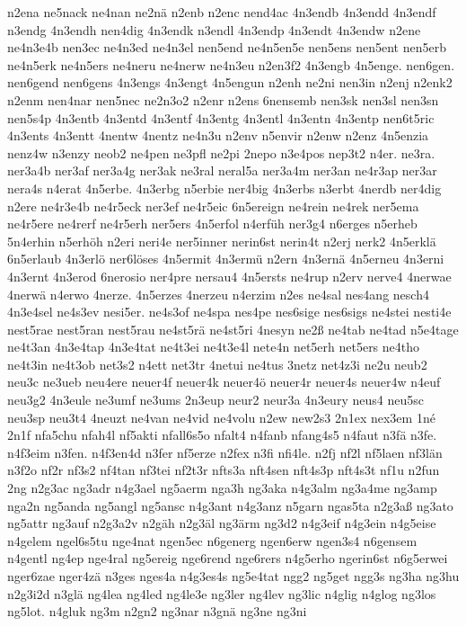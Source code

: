 {n2ena
ne5nack
ne4nan
ne2nä
n2enb
n2enc
nend4ac
4n3endb
4n3endd
4n3endf
n3endg
4n3endh
nen4dig
4n3endk
n3endl
4n3endp
4n3endt
4n3endw
n2ene
ne4n3e4b
nen3ec
ne4n3ed
ne4n3el
nen5end
ne4n5en5e
nen5ens
nen5ent
nen5erb
ne4n5erk
ne4n5ers
ne4neru
ne4nerw
ne4n3eu
n2en3f2
4n3engb
4n5enge.
nen6gen.
nen6gend
nen6gens
4n3engs
4n3engt
4n5engun
n2enh
ne2ni
nen3in
n2enj
n2enk2
n2enm
nen4nar
nen5nec
ne2n3o2
n2enr
n2ens
6nensemb
nen3sk
nen3sl
nen3sn
nen5s4p
4n3entb
4n3entd
4n3entf
4n3entg
4n3entl
4n3entn
4n3entp
nen6t5ric
4n3ents
4n3entt
4nentw
4nentz
ne4n3u
n2env
n5envir
n2enw
n2enz
4n5enzia
nenz4w
n3enzy
neob2
ne4pen
ne3pfl
ne2pi
2nepo
n3e4pos
nep3t2
n4er.
ne3ra.
ner3a4b
ner3af
ner3a4g
ner3ak
ne3ral
neral5a
ner3a4m
ner3an
ne4r3ap
ner3ar
nera4s
n4erat
4n5erbe.
4n3erbg
n5erbie
ner4big
4n3erbs
n3erbt
4nerdb
ner4dig
n2ere
ne4r3e4b
ne4r5eck
ner3ef
ne4r5eic
6n5ereign
ne4rein
ne4rek
ner5ema
ne4r5ere
ne4rerf
ne4r5erh
ner5ers
4n5erfol
n4erfüh
ner3g4
n6erges
n5erheb
5n4erhin
n5erhöh
n2eri
neri4e
ner5inner
nerin6st
nerin4t
n2erj
nerk2
4n5erklä
6n5erlaub
4n3erlö
ner6löses
4n5ermit
4n3ermü
n2ern
4n3ernä
4n5erneu
4n3erni
4n3ernt
4n3erod
6nerosio
ner4pre
nersau4
4n5ersts
ne4rup
n2erv
nerve4
4nerwae
4nerwä
n4erwo
4nerze.
4n5erzes
4nerzeu
n4erzim
n2es
ne4sal
nes4ang
nesch4
4n3e4sel
ne4s3ev
nesi5er.
ne4s3of
ne4spa
nes4pe
nes6sige
nes6sigs
ne4stei
nesti4e
nest5rae
nest5ran
nest5rau
ne4st5rä
ne4st5ri
4nesyn
ne2ß
ne4tab
ne4tad
n5e4tage
ne4t3an
4n3e4tap
4n3e4tat
ne4t3ei
ne4t3e4l
nete4n
net5erh
net5ers
ne4tho
ne4t3in
ne4t3ob
net3s2
n4ett
net3tr
4netui
ne4tus
3netz
net4z3i
ne2u
neub2
neu3c
ne3ueb
neu4ere
neuer4f
neuer4k
neuer4ö
neuer4r
neuer4s
neuer4w
n4euf
neu3g2
4n3eule
ne3umf
ne3ums
2n3eup
neur2
neur3a
4n3eury
neus4
neu5sc
neu3sp
neu3t4
4neuzt
ne4van
ne4vid
ne4volu
n2ew
new2s3
2n1ex
nex3em
1né
2n1f
nfa5chu
nfah4l
nf5akti
nfall6s5o
nfalt4
n4fanb
nfang4s5
n4faut
n3fä
n3fe.
n4f3eim
n3fen.
n4f3en4d
n3fer
nf5erze
n2fex
n3fi
nfi4le.
n2fj
nf2l
nf5laen
nf3län
n3f2o
nf2r
nf3s2
nf4tan
nf3tei
nf2t3r
nfts3a
nft4sen
nft4s3p
nft4s3t
nf1u
n2fun
2ng
n2g3ac
ng3adr
n4g3ael
ng5aerm
nga3h
ng3aka
n4g3alm
ng3a4me
ng3amp
nga2n
ng5anda
ng5angl
ng5ansc
n4g3ant
n4g3anz
n5garn
ngas5ta
n2g3aß
ng3ato
ng5attr
ng3auf
n2g3a2v
n2gäh
n2g3äl
ng3ärm
ng3d2
n4g3eif
n4g3ein
n4g5eise
n4gelem
ngel6s5tu
nge4nat
ngen5ec
n6generg
ngen6erw
ngen3s4
n6gensem
n4gentl
ng4ep
nge4ral
ng5ereig
nge6rend
nge6rers
n4g5erho
ngerin6st
n6g5erwei
nger6zae
nger4zä
n3ges
nges4a
n4g3es4s
ng5e4tat
ngg2
ng5get
ngg3s
ng3ha
ng3hu
n2g3i2d
n3glä
ng4lea
ng4led
ng4le3e
ng3ler
ng4lev
ng3lic
n4glig
n4glog
ng3los
ng5lot.
n4gluk
ng3m
n2gn2
ng3nar
n3gnä
ng3ne
ng3ni
}
